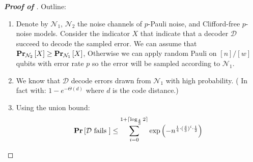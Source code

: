 \documentclass[manuscript,screen,review]{acmart}
\begin{document}
\begin{proof}[\textbf{Proof of }]

  Outline: 
  \begin{enumerate}
    \item Denote by $\mathcal{N}_{1}$, $\mathcal{N}_{2}$ the noise channels of $p$-Pauli noise, and Clifford-free $p$-noise models. Consider the indicator $X$ that indicate that a decoder $\mathcal{D}$ succeed to decode the sampled error. We can assume that $\prbm{X}{\mathcal{N}_{2}} \ge \prbm{X}{\mathcal{N}_{1}}$, Otherwise we can apply random Pauli on $[n]/[w]$ qubits with error rate $p$ so the error will be sampled according to $\mathcal{N}_1$.
    \item We know that $\mathcal{D}$ decode errors drawn from $\mathcal{N}_{1}$ with high probability. ( In fact with:  $1 - e^{-\Theta(d)}$ where $d$ is the code distance.)   
    \item Using the union bound: \begin{equation*}
        \begin{split}
          \prb{ \mathcal{D} \text{ fails } } \le \sum_{i=0}^{1 + \lceil \log_{\frac{4}{3}}{2} \rceil }{ \exp \left(  - n^{ \frac{1}{4} \cdot (\frac{4}{3})^{i} \cdot \frac{1}{2} }  \right)  }
        \end{split}
      \end{equation*}
\end{enumerate}


\end{proof}




%
\cite{leverrier2022quantum}
\cite{moore1998parallel}
\cite{Tillich_2014}
\cite{meier2012magicstate}
\cite{bravyi2012magic}
\printbibliography
\end{document}

